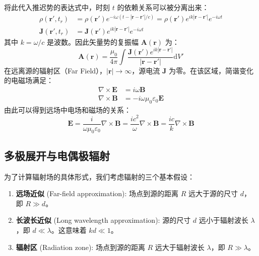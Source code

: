 \documentclass[fontset=none]{ctexart}
\begin{document}
将此代入推迟势的表达式中，时刻 $t$ 的依赖关系可以被分离出来：
\begin{equation}
    \begin{aligned}
        \rho(\bm{r}', t_r) &= \rho(\bm{r}') e^{-i\omega(t - |\bm{r}-\bm{r}'|/c)} = \rho(\bm{r}') e^{ik|\bm{r}-\bm{r}'|} e^{-i\omega t} \\
        \bm{J}(\bm{r}', t_r) &= \bm{J}(\bm{r}') e^{ik|\bm{r}-\bm{r}'|} e^{-i\omega t}
    \end{aligned}
\end{equation}
其中 $k = \omega/c$ 是波数。因此矢量势的复振幅 $\bm{A}(\bm{r})$ 为：
\begin{equation}
    \bm{A}(\bm{r}) = \frac{\mu_0}{4\pi} \int \frac{\bm{J}(\bm{r}')e^{ik|\bm{r}-\bm{r}'|}}{|\bm{r}-\bm{r}'|} \mathrm{d}V'
\end{equation}
在远离源的辐射区（Far Field），$|\bm{r}| \to \infty$，源电流 $\bm{J}$ 为零。在该区域，简谐变化的电磁场满足：
\begin{equation}
    \begin{aligned}
        \nabla \times \bm{E} &= i\omega\bm{B} \\
        \nabla \times \bm{B} &= -i\omega\mu_0\varepsilon_0 \bm{E}
    \end{aligned}
\end{equation}
由此可以得到远场中电场和磁场的关系：
\begin{equation}
    \bm{E} = \frac{i}{\omega\mu_0\varepsilon_0} \nabla \times \bm{B} = \frac{ic^2}{\omega} \nabla \times \bm{B} = \frac{ic}{k} \nabla \times \bm{B}
\end{equation}

\subsection{多极展开与电偶极辐射}
为了计算辐射场的具体形式，我们考虑辐射的三个基本假设：
\begin{enumerate}
    \item \textbf{远场近似} (Far-field approximation): 场点到源的距离 $R$ 远大于源的尺寸 $d$，即 $R \gg d$。
    \item \textbf{长波长近似} (Long wavelength approximation): 源的尺寸 $d$ 远小于辐射波长 $\lambda$，即 $d \ll \lambda$。这意味着 $kd \ll 1$。
    \item \textbf{辐射区} (Radiation zone): 场点到源的距离 $R$ 远大于辐射波长 $\lambda$，即 $R \gg \lambda$。
\end{enumerate}
\end{document}
